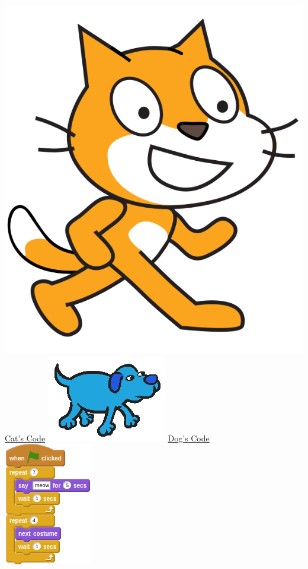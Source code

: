 \documentclass[letterpaper,12pt]{article}
\begin{document}
\indent \includegraphics[scale=.45,valign=c]{cat.png} \underline{Cat's Code} \hspace{5cm}
\includegraphics[scale=.2,valign=c]{dog.png} \underline{Dog's Code} \\
\includegraphics[scale=.7,valign=t]{q5_script0.png} \hspace{1cm}
\end{document}
